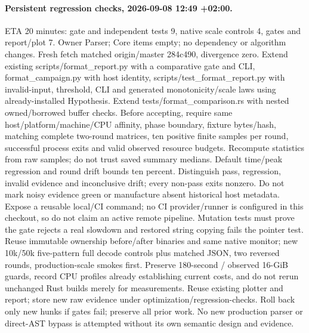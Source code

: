 \documentclass[11pt,a4paper]{article}
\begin{document}
\paragraph{Persistent regression checks, 2026-09-08 12:49 +02:00.}
ETA 20 minutes: gate and independent tests 9, native scale controls 4, gates and
report/plot 7. Owner Parser; Core items empty; no dependency or algorithm changes.
Fresh fetch matched origin/master 284c490, divergence zero. Extend existing
scripts/format\_report.py with a comparative gate and CLI, format\_campaign.py
with host identity, scripts/test\_format\_report.py with invalid-input, threshold,
CLI and generated monotonicity/scale laws using already-installed Hypothesis.
Extend tests/format\_comparison.rs with nested owned/borrowed buffer checks.
Before accepting, require same host/platform/machine/CPU affinity, phase boundary,
fixture bytes/hash, matching complete two-round matrices, ten positive finite
samples per round, successful process exits and valid observed resource budgets.
Recompute statistics from raw samples; do not trust saved summary medians.
Default time/peak regression and round drift bounds ten percent. Distinguish pass,
regression, invalid evidence and inconclusive drift; every non-pass exits nonzero.
Do not mark noisy evidence green or manufacture absent historical host metadata.
Expose a reusable local/CI command; no CI provider/runner is configured in this
checkout, so do not claim an active remote pipeline. Mutation tests must prove
the gate rejects a real slowdown and restored string copying fails the pointer test.
Reuse immutable ownership before/after binaries and same native monitor; new
10k/50k five-pattern full decode controls plus matched JSON, two reversed rounds,
production-scale smokes first. Preserve 180-second / observed 16-GiB guards,
record CPU profiles already establishing current costs, and do not rerun unchanged
Rust builds merely for measurements. Reuse existing plotter and report; store new
raw evidence under optimization/regression-checks. Roll back only new hunks if
gates fail; preserve all prior work. No new production parser or direct-AST bypass
is attempted without its own semantic design and evidence.
\end{document}
